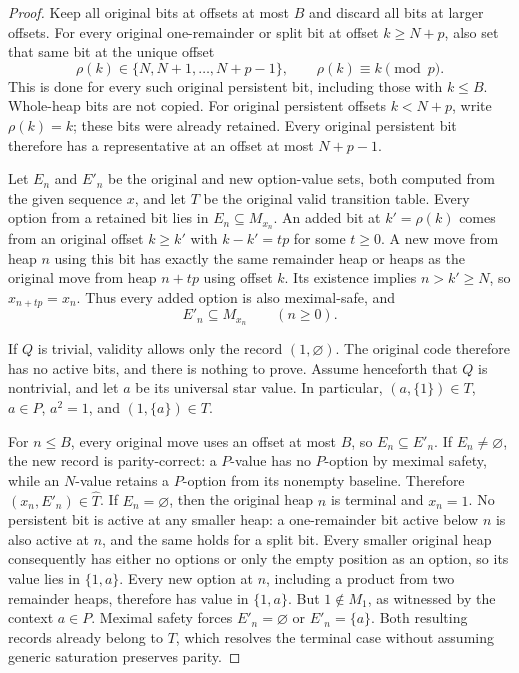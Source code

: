 \documentclass[11pt]{article}
\theoremstyle{definition}
\theoremstyle{remark}
\begin{document}
\begin{proof}
Keep all original bits at offsets at most $B$ and discard all bits at larger
offsets.  For every original one-remainder or split bit at offset
$k\ge N+p$, also set that same bit at the unique offset
\[
 \rho(k)\in\{N,N+1,\ldots,N+p-1\},\qquad
 \rho(k)\equiv k\pmod p.
\]
This is done for every such original persistent bit, including those with
$k\le B$.  Whole-heap bits are not copied.  For original persistent offsets
$k<N+p$, write $\rho(k)=k$; these bits were already retained.
Every original persistent bit therefore has a representative at an offset
at most $N+p-1$.

Let $E_n$ and $E'_n$ be the original and new option-value sets, both
computed from the given sequence $x$, and let $T$ be the original valid
transition table.  Every option from a retained bit lies in
$E_n\subseteq M_{x_n}$.  An added bit at $k'=\rho(k)$ comes from an
original offset $k\ge k'$ with $k-k'=tp$ for some $t\ge0$.
A new move from heap $n$ using this bit has exactly the same remainder
heap or heaps as the original move from heap $n+tp$ using offset $k$.
Its existence implies $n>k'\ge N$, so $x_{n+tp}=x_n$.
Thus every added option is also meximal-safe, and
\[
 E'_n\subseteq M_{x_n}\qquad(n\ge0).
\]

If $Q$ is trivial, validity allows only the record $(1,\varnothing)$.
The original code therefore has no active bits, and there is nothing to
prove.  Assume henceforth that $Q$ is nontrivial, and let $a$ be its
universal star value.  In particular,
$(a,\{1\})\in T$, $a\in P$, $a^2=1$, and
$(1,\{a\})\in T$.

For $n\le B$, every original move uses an offset at most $B$, so
$E_n\subseteq E'_n$.  If $E_n\ne\varnothing$, the new record is
parity-correct: a $P$-value has no $P$-option by meximal safety, while an
$N$-value retains a $P$-option from its nonempty baseline.  Therefore
$(x_n,E'_n)\in\widehat T$.
If $E_n=\varnothing$, then the original heap $n$ is terminal and $x_n=1$.
No persistent bit is active at any smaller heap: a one-remainder bit
active below $n$ is also active at $n$, and the same holds for a split bit.
Every smaller original heap consequently has either no options or only
the empty position as an option, so its value lies in $\{1,a\}$.
Every new option at $n$, including a product from two remainder heaps,
therefore has value in $\{1,a\}$.  But $1\notin M_1$, as witnessed by
the context $a\in P$.  Meximal safety forces
$E'_n=\varnothing$ or $E'_n=\{a\}$.
Both resulting records already belong to $T$, which resolves the terminal
case without assuming generic saturation preserves parity.


\end{proof}
\end{document}
